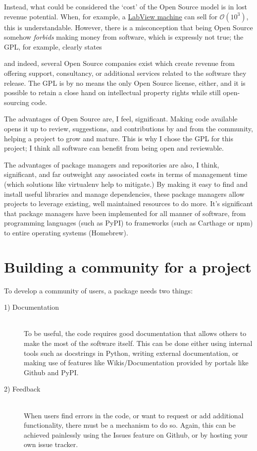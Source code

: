 \documentclass[12pt,a4paper]{article}
\begin{document}
Instead, what could be considered the `cost' of the Open Source model is in lost revenue potential. When, for example, a \href{http://actimetrics.com/products/clocklab/}{LabView machine} can sell for \textsterling $\mathcal{O}(10^{3})$, this is understandable. However, there is a misconception that being Open Source somehow \textit{forbids} making money from software, which is expressly not true; the GPL, for example, clearly states

\textit{}

and indeed, several Open Source companies exist which create revenue from offering support, consultancy, or additional services related to the software they release. The GPL is by no means the only Open Source license, either, and it is possible to retain a close hand on intellectual property rights while still open-sourcing code. 

The advantages of Open Source are, I feel, significant. Making code available opens it up to review, suggestions, and contributions by and from the community, helping a project to grow and mature. This is why I chose the GPL for this project; I think all software can benefit from being open and reviewable.

The advantages of package managers and repositories are also, I think, significant, and far outweight any associated costs in terms of management time (which solutions like virtualenv help to mitigate.) By making it easy to find and install useful libraries and manage dependencies, these package managers allow projects to leverage existing, well maintained resources to do more. It's significant that package managers have been implemented for all manner of software, from programming languages (such as PyPI) to frameworks (such as Carthage or npm) to entire operating systems (Homebrew). 

\section*{Building a community for a project}
To develop a community of users, a package needs two things:
\begin{description}
    \item[1) Documentation] \hfill \\
    To be useful, the code requires good documentation that allows others to make the most of the software itself. This can be done either using internal tools such as docstrings in Python, writing external documentation, or making use of features like Wikis/Documentation provided by portals like Github and PyPI.
    \item[2) Feedback] \hfill \\
    When users find errors in the code, or want to request or add additional functionality, there must be a mechanism to do so. Again, this can be achieved painlessly using the Issues feature on Github, or by hosting your own issue tracker. 
\end{description}
\end{document}
